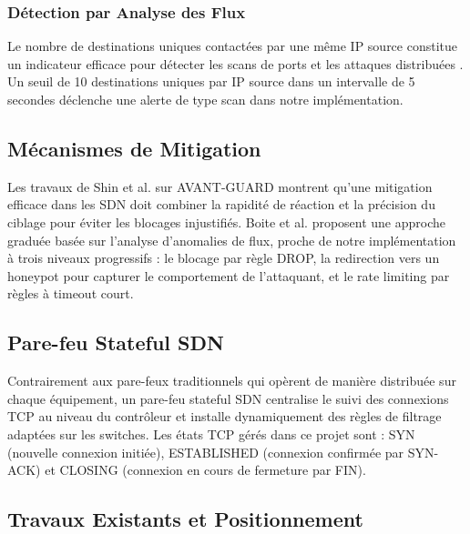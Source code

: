 \documentclass[12pt,a4paper]{report}
\begin{document}
\subsubsection{Détection par Analyse des Flux}
Le nombre de destinations uniques contactées par une
même IP source constitue un indicateur efficace pour
détecter les scans de ports et les attaques distribuées
\cite{mousavi2015early}. Un seuil de 10 destinations
uniques par IP source dans un intervalle de 5 secondes
déclenche une alerte de type scan dans notre implémentation.

\subsection{Mécanismes de Mitigation}
Les travaux de Shin et al. \cite{shin2013avant} sur
AVANT-GUARD montrent qu'une mitigation efficace dans les
SDN doit combiner la rapidité de réaction et la précision
du ciblage pour éviter les blocages injustifiés. Boite
et al. \cite{boite2021toward} proposent une approche
graduée basée sur l'analyse d'anomalies de flux, proche
de notre implémentation à trois niveaux progressifs :
le blocage par règle DROP, la redirection vers un honeypot
pour capturer le comportement de l'attaquant, et le rate
limiting par règles à timeout court.

\subsection{Pare-feu Stateful SDN}
Contrairement aux pare-feux traditionnels qui opèrent
de manière distribuée sur chaque équipement, un pare-feu
stateful SDN centralise le suivi des connexions TCP au
niveau du contrôleur et installe dynamiquement des règles
de filtrage adaptées sur les switches. Les états TCP
gérés dans ce projet sont : SYN (nouvelle connexion
initiée), ESTABLISHED (connexion confirmée par SYN-ACK)
et CLOSING (connexion en cours de fermeture par FIN).

\subsection{Travaux Existants et Positionnement}
\end{document}
